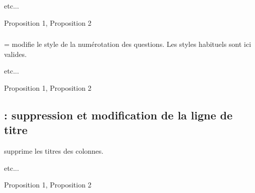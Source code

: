 \begin{minipage}[c][][t]{.45\linewidth}
\begin{tkzexample}
  \begin{alterqcm}[lq=3cm,num=false]
     etc...
  \end{alterqcm}
\end{tkzexample}
\end{minipage}\hfill
\begin{minipage}[c][][t]{.45\linewidth}
  \begin{alterqcm}[lq=3cm,num=false]
  {%
  {Proposition 1},
  {Proposition 2}}
  \end{alterqcm}
\end{minipage}   

\subsubsection{}   

= modifie le style de la numérotation des questions. Les styles  habituels sont ici valides.

\begin{minipage}[c][][t]{.45\linewidth}
\begin{tkzexample}
 \begin{alterqcm}[lq=3cm,numstyle=\alph]
   etc...
 \end{alterqcm}
\end{tkzexample}  
\end{minipage}
\hfill
\begin{minipage}[c][][t]{.45\linewidth}
  \begin{alterqcm}[lq=3cm,numstyle=\alph]
  {%
  {Proposition 1},
  {Proposition 2}}
  \end{alterqcm}
\end{minipage}       
 
\subsection{ : suppression et modification de la ligne de titre }

 supprime les titres des colonnes.

\begin{minipage}[c][][t]{.45\linewidth}
\begin{tkzexample}
  \begin{alterqcm}%
  [lq=3cm,title=false]
  etc...
  \end{alterqcm}\end{tkzexample}
\end{minipage}\hfill
\begin{minipage}[c][][t]{.45\linewidth}
  \begin{alterqcm}%
  [lq=3cm,title=false]
  {%
  {Proposition 1},
  {Proposition 2}%
  }
  \end{alterqcm}
\end{minipage}
                      

